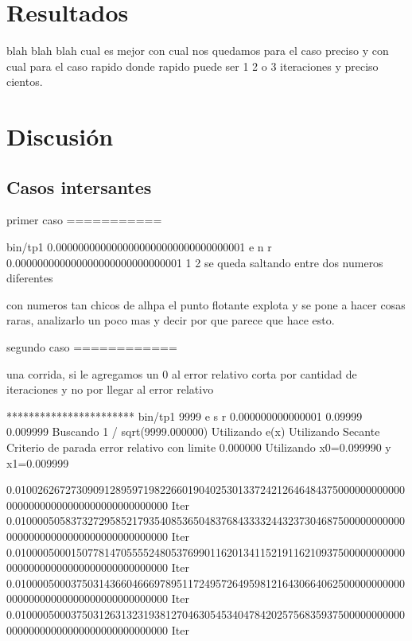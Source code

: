 \documentclass[10pt,a4paper]{article} \usepackage[utf8]{inputenc} %
\begin{document}
\section{Resultados}

blah blah blah cual es mejor con cual nos quedamos para el caso preciso y con
cual para el caso rapido donde rapido puede ser 1 2 o 3 iteraciones y preciso
cientos.
\section{Discusión}

\subsection{Casos intersantes}

primer caso
===========

bin/tp1 0.0000000000000000000000000000000001 e n r 0.000000000000000000000000000001 1 2
se queda saltando entre dos numeros diferentes

con numeros tan chicos de alhpa el punto flotante explota y se pone a hacer cosas raras, analizarlo un poco mas y decir por que parece que hace esto.


segundo caso
============

una corrida, si le agregamos un 0 al error relativo corta por cantidad de iteraciones y no por llegar al error relativo

*********************** bin/tp1 9999 e s r 0.000000000000001 0.09999 0.009999
Buscando 1 / sqrt(9999.000000)
Utilizando e(x)
Utilizando Secante
Criterio de parada error relativo con limite 0.000000
Utilizando x0=0.099990 y x1=0.009999

0.010026267273090912895971982266019040253013372421264648437500000000000000000000000000000000000000000 Iter
0.010000505837327295852179354085365048376843333244323730468750000000000000000000000000000000000000000 Iter
0.010000500015077814705555248053769901162013411521911621093750000000000000000000000000000000000000000 Iter
0.010000500037503143660466697895117249572649598121643066406250000000000000000000000000000000000000000 Iter
0.010000500037503126313231938127046305453404784202575683593750000000000000000000000000000000000000000 Iter
\end{document}
